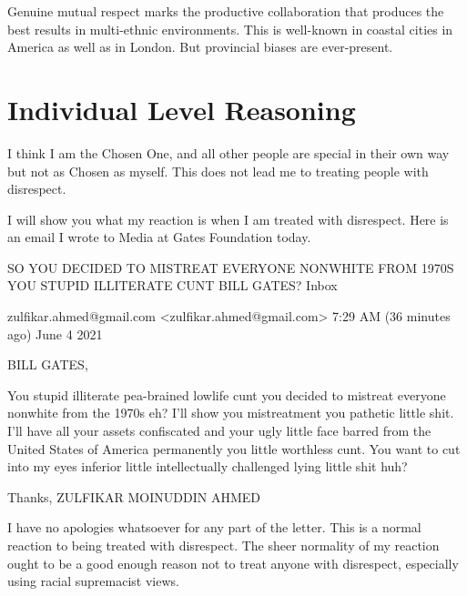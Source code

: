\documentclass{amsart}
\begin{document}
Genuine mutual respect marks the productive collaboration that produces the best results in multi-ethnic environments.  This is well-known in coastal cities in America as well as in London.  But provincial biases are ever-present.

\section{Individual Level Reasoning}

I think I am the Chosen One, and all other people are special in their own way but not as Chosen as myself.  This does not lead me to treating people with disrespect.  

I will show you what my reaction is when I am treated with disrespect.  Here is an email I wrote to Media at Gates Foundation today.

SO YOU DECIDED TO MISTREAT EVERYONE NONWHITE FROM 1970S YOU STUPID ILLITERATE CUNT BILL GATES?
Inbox

zulfikar.ahmed@gmail.com <zulfikar.ahmed@gmail.com>
7:29 AM (36 minutes ago) June 4 2021


BILL GATES,

You stupid illiterate pea-brained lowlife cunt you decided to mistreat everyone nonwhite from the 1970s eh?  I'll show you mistreatment you pathetic little shit.  I'll have all your assets confiscated and your ugly little face barred from the United States of America permanently you little worthless cunt.  You want to cut into my eyes inferior little intellectually challenged lying little shit huh?  

Thanks,
ZULFIKAR MOINUDDIN AHMED

I have no apologies whatsoever for any part of the letter.  This is a normal reaction to being treated with disrespect.  The sheer normality of my reaction ought to be a good enough reason not to treat anyone with disrespect, especially using racial supremacist views.
\end{document}
